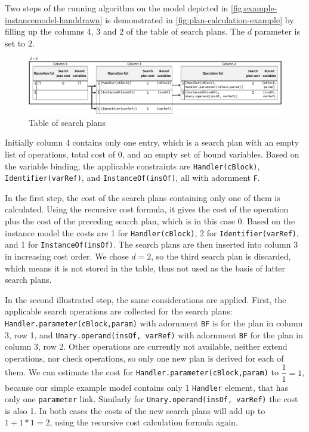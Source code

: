Two steps of the running algorithm on the model depicted in \autoref{fig:example-instancemodel-handdrawn}  is demonstrated in \autoref{fig:plan-calculation-example} by filling up the columns 4, 3 and 2 of the table of search plans. The $d$ parameter is set to $2$.

\begin{figure}[!htp]
	\centering
	\includegraphics[width=\textwidth]{figures/pdfs/plan-calculation.pdf}
	\caption{Table of search plans}
	\label{fig:plan-calculation-example}
\end{figure}

Initially column 4 contains only one entry, which is a search plan with an empty list of operations, total cost of 0, and an empty set of bound variables. Based on the variable binding, the applicable constraints are \texttt{Handler(cBlock)}, \texttt{Identifier(varRef)}, and \texttt{InstanceOf(insOf)}, all with adornment \texttt{F}. 

In the first step, the cost of the search plans containing only one of them is calculated. Using the recursive cost formula, it gives the cost of the operation plus the cost of the preceding search plan, which is in this case 0. Based on the instance model the costs are 1 for \texttt{Handler(cBlock)}, 2 for  \texttt{Identifier(varRef)}, and 1 for \texttt{InstanceOf(insOf)}. The search plans are then inserted into column 3 in increasing cost order. We chose $d = 2$, so the third search plan is discarded, which means it is not stored in the table, thus not used as the basis of latter search plans.

In the second illustrated step, the same considerations are applied. First, the applicable search operations are collected for the search plans: \texttt{Handler.parameter(cBlock,param)} with adornment \texttt{BF} is for the plan in column 3, row 1, and \texttt{Unary.operand(insOf, varRef)} with adornment \texttt{BF} for the plan in column 3, row 2. Other operations are currently not available, neither extend operations, nor check operations, so only one new plan is derived for each of them.  We can estimate the cost for \texttt{Handler.parameter(cBlock,param)} to $\dfrac{1}{1} = 1$, because our simple example model contains only 1 \texttt{Handler} element, that has only one \texttt{parameter} link. Similarly for \texttt{Unary.operand(insOf, varRef)} the cost is also 1. In both cases the costs of the new search plans will add up to $1 + 1 * 1 = 2$, using the recursive cost calculation formula again.

